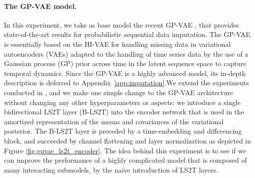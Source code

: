 \documentclass{article} \usepackage{iclr2021_conference,times}
\theoremstyle{plain}
\theoremstyle{definition}
\begin{document}
\paragraph{The GP-VAE model.}
In this experiment, we take as base model the recent GP-VAE \citep{fortuin2019gpvae}, that provides state-of-the-art results for probabilistic sequential data imputation. 
The GP-VAE is essentially based on the HI-VAE \citep{nazabal2018handling} for handling missing data in variational autoencoders (VAEs) \citep{kingma2013auto} adapted to the handling of time series data by the use of a Gaussian process (GP) prior \citep{williams2006gaussian} across time in the latent sequence space to capture temporal dynamics.
Since the GP-VAE is a highly advanced model, its in-depth description is deferred to Appendix~\ref{app:imputation}.We extend the experiments conducted in \citet{fortuin2019gpvae}, and we make one simple change to the GP-VAE architecture without changing any other hyperparameters or aspects: we introduce a single bidirectional LS2T layer (B-LS2T) into the encoder network that is used in the amortized representation of the means and covariances of the variational posterior.
The B-LS2T layer is preceded by a time-embedding and differencing block, and succeeded by channel flattening and layer normalization as depicted in Figure \ref{fig:gpvae_ls2t_encoder}. The idea behind this experiment is to see if we can improve the performance of a highly complicated model that is composed of many interacting submodels, by the naive introduction of LS2T layers.
\end{document}
